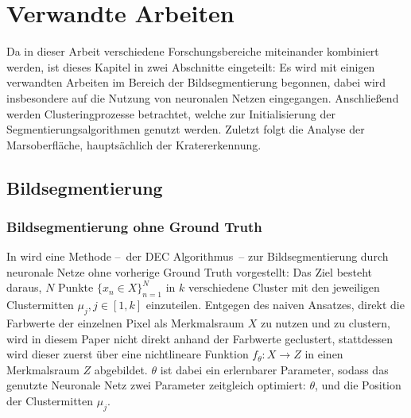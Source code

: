 \chapter{Verwandte Arbeiten}
\label{chap:verwarbeiten}

Da in dieser Arbeit verschiedene Forschungsbereiche miteinander kombiniert werden, ist dieses Kapitel in zwei Abschnitte eingeteilt: Es wird mit einigen verwandten Arbeiten im Bereich der Bildsegmentierung begonnen, dabei wird insbesondere auf die Nutzung von neuronalen Netzen eingegangen. Anschließend werden Clusteringprozesse betrachtet, welche zur Initialisierung der Segmentierungsalgorithmen genutzt werden. Zuletzt folgt die Analyse der Marsoberfläche, hauptsächlich der Kratererkennung. %

\section{Bildsegmentierung}
\label{sec:segmentation}

\subsection{Bildsegmentierung ohne Ground Truth}
\label{ssec:dec}
In \cite{junyuan_16} wird eine Methode --~der DEC Algorithmus~-- zur Bildsegmentierung durch neuronale Netze ohne vorherige Ground Truth vorgestellt: Das Ziel besteht daraus, $N$ Punkte $\{x_n\in X\}_{n=1}^N$ in $k$ verschiedene Cluster mit den jeweiligen Clustermitten $\mu_j, j\in\left[1, k\right]$ einzuteilen. Entgegen des naiven Ansatzes, direkt die Farbwerte der einzelnen Pixel als Merkmalsraum $X$ zu nutzen und zu clustern, wird in diesem Paper nicht direkt anhand der Farbwerte geclustert, stattdessen wird dieser zuerst über eine nichtlineare Funktion $f_\theta: X\rightarrow Z$ in einen Merkmalsraum $Z$ abgebildet. $\theta$ ist dabei ein erlernbarer Parameter, sodass das genutzte Neuronale Netz zwei Parameter zeitgleich optimiert: $\theta$, und die Position der Clustermitten $\mu_j$.

